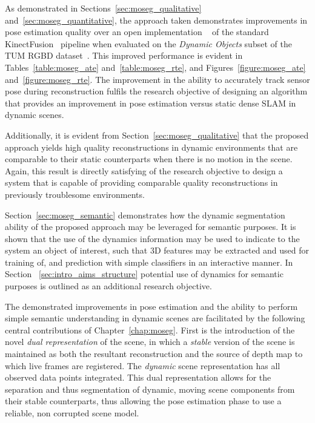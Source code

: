 As demonstrated in Sections~\ref{sec:moseg_qualitative} and~\ref{sec:moseg_quantitative}, the 
approach taken demonstrates improvements in pose estimation quality over an open implementation
~\cite{Prisacariu2014} of the standard KinectFusion~\cite{Newcombe2011} pipeline when evaluated 
on the \textit{Dynamic Objects} subset of the TUM RGBD dataset~\cite{Sturm2012}. This improved 
performance is evident in Tables~\ref{table:moseg_ate} and~\ref{table:moseg_rte}, and 
Figures~\ref{figure:moseg_ate} and~\ref{figure:moseg_rte}. The improvement in the ability to 
accurately track sensor pose during reconstruction fulfils the research objective of designing 
an algorithm that provides an improvement in pose estimation versus static dense SLAM in dynamic 
scenes.

Additionally, it is evident from Section~\ref{sec:moseg_qualitative} that the proposed approach 
yields high quality reconstructions in dynamic environments that are comparable to their static 
counterparts when there is no motion in the scene. Again, this result is directly satisfying of 
the research objective to design a system that is capable of providing comparable quality 
reconstructions in previously troublesome environments.

Section~\ref{sec:moseg_semantic} demonstrates how the dynamic segmentation ability of the proposed 
approach may be leveraged for semantic purposes. It is shown that the use of the dynamics information 
may be used to indicate to the system an object of interest, such that 3D features may be extracted 
and used for training of, and prediction with simple classifiers in an interactive manner. In Section
~\ref{sec:intro_aims_structure} potential use of dynamics for semantic purposes is outlined as an 
additional research objective.

The demonstrated improvements in pose estimation and the ability to perform simple semantic 
understanding in dynamic scenes are facilitated by the following central contributions of 
Chapter~\ref{chap:moseg}. First is the introduction of the novel \textit{dual representation} of 
the scene, in which a \textit{stable} version of the scene is maintained as both the resultant 
reconstruction and the source of depth map to which live frames are registered. The 
\textit{dynamic} scene representation has all observed data points integrated. This dual 
representation allows for the separation and thus segmentation of dynamic, moving scene components 
from their stable counterparts, thus allowing the pose estimation phase to use a reliable, non 
corrupted scene model.

